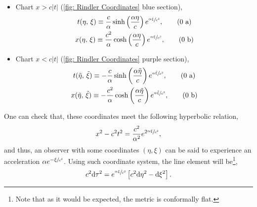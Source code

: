 \begin{itemize}
	\item Chart $x>c|t|$ (\ref{fig: Rindler Coordinates} blue section),
	\begin{subequations}
		\begin{gather}
			t(\eta,\,\xi)\equiv \frac{c}{\alpha}\sinh\left(\frac{\alpha\eta}{c}\right)e^{\sfrac{\alpha\xi}{c^2}},\tag{\theequation \,\,a}\\ x(\eta,\,\xi)\equiv \frac{c^2}{\alpha}\cosh\left(\frac{\alpha\eta}{c}\right)e^{\sfrac{\alpha\xi}{c^2}},\tag{\theequation \,\,b}
		\end{gather}
	\end{subequations}
	\item Chart $x<c|t|$ (\ref{fig: Rindler Coordinates} purple section),
	\begin{subequations}
		\begin{gather}
			t(\tilde\eta,\,\tilde\xi)\equiv- \frac{c}{\alpha}\sinh\left(\frac{\alpha\tilde\eta}{c}\right)e^{\sfrac{\alpha\tilde\xi}{c^2}},\tag{\theequation \,\,a}\\ x(\tilde\eta,\,\tilde\xi)\equiv -\frac{c^2}{\alpha}\cosh\left(\frac{\alpha\tilde\eta}{c}\right)e^{\sfrac{\alpha\tilde\xi}{c^2}},\tag{\theequation \,\,b}
		\end{gather}
	\end{subequations}
\end{itemize}
One can check that, these coordinates meet the following hyperbolic relation,
\begin{equation}
	x^2-c^2t^2=\frac{c^2}{\alpha^2}e^{2\sfrac{\alpha\xi}{c^2}},
\end{equation}
and thus, an observer with some coordinates $(\eta,\xi)$ can be said to experience an acceleration $\alpha e^{-\xi\sfrac{}{c^2}}$. Using such coordinate system, the line element will be\footnote{Note that as it would be expected, the metric is conformally flat.},
\begin{equation}
	c^2\text{d} \tau^2=e^{\sfrac{\alpha\xi}{c^2}}\left[c^2\text{d}\eta^2-\text{d}\xi^2\right].
\end{equation}

